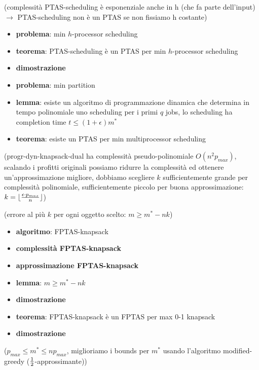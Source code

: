 (complessità PTAS-scheduling è esponenziale anche in h (che fa parte
dell'input) \(\rightarrow\) PTAS-scheduling non è un PTAS se non
fissiamo h costante)

\begin{itemize}

\item
  \textbf{problema}: min \(h\)-processor scheduling
\item
  \textbf{teorema}: PTAS-scheduling è un PTAS per min \(h\)-processor
  scheduling
\item
  \textbf{dimostrazione}
\item
  \textbf{problema}: min partition
\item
  \textbf{lemma}: esiste un algoritmo di programmazione dinamica che
  determina in tempo polinomiale uno scheduling per i primi \(q\) jobs,
  lo scheduling ha completion time \(t \leq (1+\epsilon)m^*\)
\item
  \textbf{teorema}: esiste un PTAS per min multiprocessor scheduling
\end{itemize}

    (progr-dyn-knapsack-dual ha complessità pseudo-polinomiale
\(O(n^2p_{max})\), scalando i profitti originali possiamo ridurre la
complessità ed ottenere un'approssimazione migliore, dobbiamo scegliere
\(k\) sufficientemente grande per complessità polinomiale,
sufficientemente piccolo per buona approssimazione:
\(k=\lfloor {{\epsilon \cdot p_{max}} \over n } \rfloor\))

(errore al più \(k\) per ogni oggetto scelto: \(m \geq m^* - nk\))

\begin{itemize}

\item
  \textbf{algoritmo}: FPTAS-knapsack
\item
  \textbf{complessità FPTAS-knapsack}
\item
  \textbf{approssimazione FPTAS-knapsack}
\item
  \textbf{lemma}: \(m \geq m^* - nk\)
\item
  \textbf{dimostrazione}
\item
  \textbf{teorema}: FPTAS-knapsack è un FPTAS per max 0-1 knapsack
\item
  \textbf{dimostrazione}
\end{itemize}

(\(p_{max} \leq m^* \leq np_{max}\), miglioriamo i bounds per \(m^*\)
usando l'algoritmo modified-greedy (\({1 \over 2}\)-approssimante))

